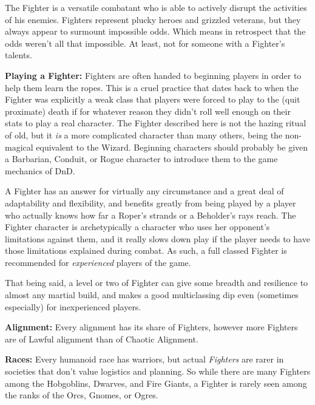 
The Fighter is a versatile combatant who is able to actively disrupt the activities of his enemies. Fighters represent plucky heroes and grizzled veterans, but they always appear to surmount impossible odds. Which means in retrospect that the odds weren't all that impossible. At least, not for someone with a Fighter's talents.

\textbf{Playing a Fighter:} Fighters are often handed to beginning players in order to help them learn the ropes. This is a cruel practice that dates back to when the Fighter was explicitly a weak class that players were forced to play to the (quit proximate) death if for whatever reason they didn't roll well enough on their stats to play a real character. The Fighter described here is not the hazing ritual of old, but it \textit{is} a more complicated character than many others, being the non-magical equivalent to the Wizard. Beginning characters should probably be given a Barbarian, Conduit, or Rogue character to introduce them to the game mechanics of DnD.

A Fighter has an answer for virtually any circumstance and a great deal of adaptability and flexibility, and benefits greatly from being played by a player who actually knows how far a Roper's strands or a Beholder's rays reach. The Fighter character is archetypically a character who uses her opponent's limitations against them, and it really slows down play if the player needs to have those limitations explained during combat. As such, a full classed Fighter is recommended for \textit{experienced} players of the game.

That being said, a level or two of Fighter can give some breadth and resilience to almost any martial build, and makes a good multiclassing dip even (sometimes especially) for inexperienced players.

\textbf{Alignment:} Every alignment has its share of Fighters, however more Fighters are of Lawful alignment than of Chaotic Alignment.

\textbf{Races:} Every humanoid race has warriors, but actual \textit{Fighters} are rarer in societies that don't value logistics and planning. So while there are many Fighters among the Hobgoblins, Dwarves, and Fire Giants, a Fighter is rarely seen among the ranks of the Orcs, Gnomes, or Ogres.

